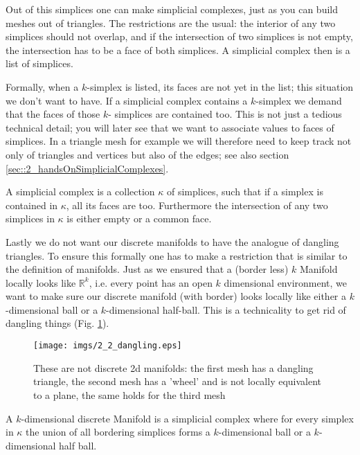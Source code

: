 Out of this simplices one can make simplicial complexes, just as you can build meshes out of triangles. The restrictions are the usual: the interior of any two simplices should not overlap, and if the intersection of two simplices is not empty, the intersection has to be a face of both simplices.  A simplicial complex then is a list of simplices. 

Formally, when a $k$-simplex is listed, its faces are not yet in the list; this situation we don't want to have. If a simplicial complex contains a  $k$-simplex we demand that the faces of those $k$- simplices are contained too. This is not just a tedious technical detail; you will later see that we want to associate values to faces of simplices. In a triangle mesh for example we will therefore need to keep track not only of triangles and vertices but also of the edges; see also section \ref{sec::2_handsOnSimplicialComplexes}.

\begin{definition}
A simplicial  complex is a collection $\kappa$ of simplices, such that if a simplex is contained in $\kappa$, all its faces are too. Furthermore the intersection of any two simplices in  $\kappa$ is either empty or a common face.
\end{definition}

Lastly we do not want our discrete manifolds  to have the analogue of dangling triangles. To ensure this formally one has to make a restriction that is similar to the definition of manifolds. Just as we ensured that a (border less) $k$ Manifold locally looks like $\mathbb R^k$, i.e. every point has an open $k$ dimensional environment, we want to make sure our discrete manifold (with border) looks locally like either a $k$-dimensional ball or a $k$-dimensional half-ball. This is a technicality to get rid of dangling things (Fig. \ref{fig::2_2_dangling}).

\begin{figure}
\begin{center}
\texttt{[image: imgs/2\_2\_dangling.eps]}
\caption{These are not discrete 2d manifolds: the first mesh has a dangling triangle, the second mesh has a 'wheel' and is not locally equivalent to a plane, the same holds for the third mesh}
\label{fig::2_2_dangling}
\end{center}
\end{figure}

\begin{definition}
A $k$-dimensional discrete Manifold is a simplicial complex where for every simplex in $\kappa$ the union of all bordering simplices forms a $k$-dimensional ball or a $k$-dimensional half ball.
\end{definition} 


